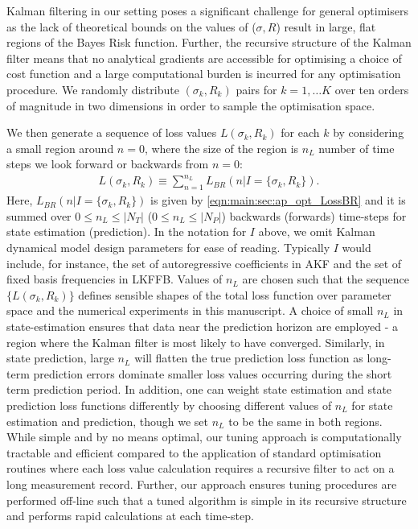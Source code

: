 Kalman filtering in our setting poses a significant challenge for general optimisers as the lack of theoretical bounds on the values of ($\sigma, R$) result in large, flat regions of the Bayes Risk function. Further, the recursive structure of the Kalman filter means that no analytical gradients are accessible for optimising a choice of cost function and a large computational burden is incurred for any optimisation procedure. We randomly distribute $(\sigma_{k}, R_{k})$ pairs for $k=1, \hdots K $ over ten orders of magnitude in two dimensions in order to sample the optimisation space.

We then generate a sequence of loss values $L(\sigma_k, R_k)$ for each $k$ by considering a small region around $n=0$, where the size of the region is $n_L$ number of time steps we look forward or backwards from $n=0$:
\begin{align}
	L(\sigma_k, R_k) \equiv  \sum_{n=1}^{n_L} L_{BR}(n | I= \{\sigma_k, R_k \}) \label{eqn:main:risk:optriskvalue}.
\end{align}
Here, $L_{BR}(n | I= \{\sigma_k, R_k \})$ is given by \cref{eqn:main:sec:ap_opt_LossBR} and it is summed over $0\leq n_L\leq |N_{T}|$  ($0\leq n_L\leq |N_{P}|$) backwards (forwards) time-steps for state estimation (prediction). In the notation for $I$ above, we omit Kalman dynamical model design parameters for ease of reading.  Typically $I$ would include, for instance, the set of autoregressive coefficients in AKF and the set of fixed basis frequencies in LKFFB. Values of $n_L$ are chosen such that the sequence $\{L(\sigma_k, R_k) \}$ defines sensible shapes of the total loss function over parameter space and the numerical experiments in this manuscript. A choice of small $n_L$ in state-estimation ensures that data near the prediction horizon are employed - a region where the Kalman filter is most likely to have converged.  Similarly, in state prediction, large $n_L$ will flatten the true prediction loss function as long-term prediction errors dominate smaller loss values occurring during the short term prediction period. In addition, one can weight state estimation and state prediction loss functions differently by choosing different values of $n_L$ for state estimation and prediction, though we set $n_L$ to be the same in both regions. While simple and by no means optimal, our tuning approach is computationally tractable and efficient compared to the application of standard optimisation routines where each loss value calculation requires a recursive filter to act on a long measurement record. Further, our approach ensures tuning procedures are performed off-line such that a tuned algorithm is simple in its recursive structure and performs rapid calculations at each time-step.

